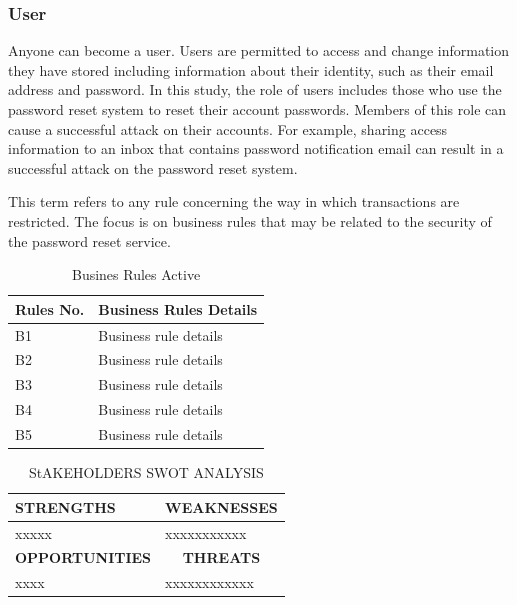 \subsubsection{User} 
Anyone can become a user.  Users are permitted to access and change
information they have stored including information about their identity,
such as their email address and password. In this study, the role of
users includes those who use the password reset system to reset their
account passwords. Members of this role can cause a successful attack
on their accounts. For example, sharing access information to an inbox
that contains password notification email can result in a successful
attack on the password reset system.

This term refers to any rule concerning the way in which transactions are restricted. The focus is on business rules that may be related to the security of the password reset service.

\begin{table}[!htbp]	      %
	\begin{center}
\begin{tabular}{|l|p{5.5cm}|} \hline
 \textbf{ Rules No. } & \multicolumn{1}{|c|}{\textbf{Business Rules Details}} \\
\hline
 B1 & Business rule details \\
\hline
 B2 & Business rule details \\
\hline
 B3 & Business rule details \\
\hline B4 & Business rule details \\
\hline
 B5 & Business rule details \\
\hline
	\end{tabular} \end{center} \caption{ Busines Rules Active }
\label{Stkroles} \end{table}

\begin{table}[!htbp]	      %
	\begin{center}
\begin{tabular}{|l|p{5.5cm}|} \hline
 \textbf{STRENGTHS} & \multicolumn{1}{|c|}{\textbf{WEAKNESSES}} \\
\hline
 xxxxx & xxxxxxxxxxx \\
\hline
 \textbf{ OPPORTUNITIES } & \multicolumn{1}{|c|}{\textbf{THREATS}} \\
\hline
 xxxx & xxxxxxxxxxxx \\
\hline

	\end{tabular} \end{center} \caption{ StAKEHOLDERS SWOT ANALYSIS }
\label{Stkroles} \end{table}



